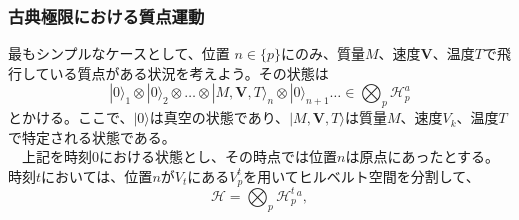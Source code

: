 \subsubsection{古典極限における質点運動}
最もシンプルなケースとして、位置 $n \in \{p\}$にのみ、質量$M$、速度$\mathbf{V}$、温度$T$で飛行している質点がある状況を考えよう。その状態は
\begin{equation}
    |0\rangle_1 \otimes |0\rangle_2 \otimes \ldots \otimes |M,\mathbf{V},T\rangle_n \otimes |0\rangle_{n+1} \ldots \in \bigotimes_p \mathcal{H}_p^a
\end{equation}
とかける。ここで、$|0\rangle$は真空の状態であり、$|M,\mathbf{V},T\rangle$は質量$M$、速度$V_k$、温度$T$で特定される状態である。\\
　上記を時刻$0$における状態とし、その時点では位置$n$は原点にあったとする。時刻$t$においては、位置$n$が$V_t$にある$V^t_p$を用いてヒルベルト空間を分割して、
\begin{equation}
    \mathcal{H} = \bigotimes_p \mathcal{H}^t_p^a,
\end{equation}